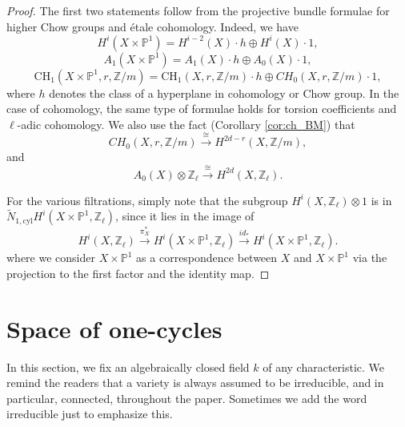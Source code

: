 \documentclass{amsart}
\theoremstyle{definition}
\theoremstyle{remark}
\newcommand{\mbb}{\mathbb}
\newcommand{\ZZ}{\mbb{Z}}
\newcommand{\PP}{\mbb{P}}
\newcommand{\cyl}{\text{cyl}}
\begin{document}
\begin{proof}
   
    
    The first two statements  follow from the projective bundle formulae for higher Chow groups and \'etale cohomology. Indeed, we have
    \[
    H^{i}(X \times \PP^1)= H^{i-2}(X) \cdot h \oplus H^{i}(X)\cdot 1,
    \]
    \[
    A_1(X \times \PP^1)= A_1(X) \cdot h \oplus A_{0}(X)\cdot 1,
    \]
    \[
    \text{CH}_1(X \times \PP^1, r, \ZZ/m)= \text{CH}_1(X, r, \ZZ/m) \cdot h \oplus CH_0(X, r, \ZZ/m) \cdot 1,
    \]
    where $h$ denotes the class of a hyperplane in cohomology or Chow group.
    In the case of cohomology, the same type of formulae holds for torsion coefficients and $\ell$-adic cohomology. We also use the fact (Corollary \ref{cor:ch_BM}) that
    \[
    CH_0(X, r, \ZZ/m)\xrightarrow{\cong} H^{2d-r}(X, \ZZ/m),
    \]
    and 
    \[
    A_0(X)\otimes \ZZ_\ell \xrightarrow{\cong} H^{2d}(X, \ZZ_\ell).
    \]
    
    For the various filtrations, simply note that the subgroup $H^{i}(X, \ZZ_\ell) \otimes 1$ is in $\tilde{N}_{1, \cyl}H^i(X \times \PP^1, \ZZ_\ell)$, since it lies in the image of \[
    H^{i}(X, \ZZ_\ell)  \xrightarrow{\pi_X^*} H^{i}(X\times \PP^1, \ZZ_\ell)\xrightarrow{id_*} H^i(X \times \PP^1, \ZZ_\ell).\]
    where we consider $X \times \PP^1$ as a correspondence between $X$ and $X \times \PP^1$ via the projection to the first factor and the identity map. 
\end{proof}

\section{Space of one-cycles}\label{sec:space}
In this section, we fix an algebraically closed field $k$ of any characteristic.
We remind the readers that a variety is always assumed to be irreducible,  and in particular, connected, throughout the paper.
Sometimes we add the word irreducible just to emphasize this.
\end{document}
